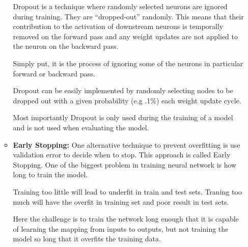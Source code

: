 \begin{itemize}
\begin{itemize}
    Dropout is a technique where randomly selected neurons are ignored during training. They are “dropped-out” randomly. This means that their contribution to the activation of downstream neurons is temporally removed on the forward pass and any weight updates are not applied to the neuron on the backward pass.
    
    Simply put, it is the process of ignoring some of the neurons in particular forward or backward pass.
    
    Dropout can be easily implemented by randomly selecting nodes to be dropped out with a given probability (e.g .1\%) each weight update cycle.
    
    Most importantly Dropout is only used during the training of a model and is not used when evaluating the model. \\
    \item \textbf{Early Stopping: } One alternative technique to prevent overfitting is use validation error to decide when to stop. This approach is called Early Stopping.
    One of the biggest problem in training neural network is how long to train the model.
    
    Training too little will lead to underfit in train and test sets. Traning too much will have the overfit in training set and poor result in test sets.
    
    Here the challenge is to train the network long enough that it is capable of learning the mapping from inputs to outputs, but not training the model so long that it overfits the training data.
    

\end{itemize}
\end{itemize}
